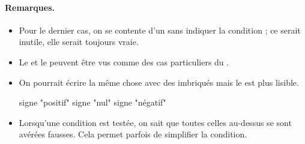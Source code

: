 	\paragraph{Remarques.}
	\begin{itemize}
	\item
		Pour le dernier cas, on se contente
		d'un  sans indiquer la condition ;
		ce serait inutile, elle serait toujours vraie.
	\item
		Le  et le  
		peuvent être vus comme des cas particuliers du 
		.
	\item
		On pourrait écrire la même chose 
		avec des  imbriqués
		mais le  est plus lisible.
		\\
		\begin{LDA}
				\Let signe \Gets "positif"
			\Else
					\Let signe \Gets "nul"
				\Else
					\Let signe \Gets "négatif"
				\EndIf
			\EndIf
		\end{LDA}
	\item
		Lorsqu'une condition est testée,
		on sait que toutes celles au-dessus
		se sont avérées fausses.
		Cela permet parfois de simplifier la condition.
	\end{itemize}
	
